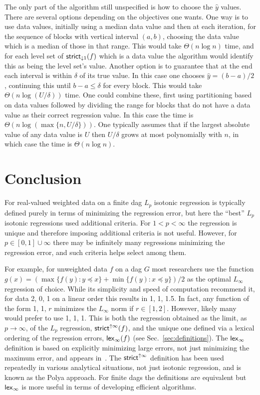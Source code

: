 \documentclass[11pt]{article}
\newcommand{\Strictdown}[2]{\ensuremath{\mathsf{strict}_{\downarrow{#1}}\ifthenelse{\equal{#2}{}}{}{(#2)}}}
\newcommand{\Strictup}[2]{\ensuremath{\mathsf{strict}^{\uparrow {#1}}\ifthenelse{\equal{#2}{}}{}{(#2)}}}
\newcommand{\lex}[2]{\ensuremath{\mathsf{lex}_{#1} \ifthenelse{\equal{#2}{}}{}{(#2)}}}
\begin{document}
The only part of the algorithm still unspecified is how to choose the $\hat{y}$ values.
There are several options depending on the objectives one wants.
One way is to use data values, initially using a median data value and then at each iteration, for the sequence of blocks with vertical interval $(a,b)$, choosing the data value which is a median of those in that range.
This would take $\Theta(n \log n)$ time, and for each level set of \Strictdown{1}{f} which is a data value the algorithm would identify this as being the level set's value.
Another option is to guarantee that at the end each interval is within $\delta$ of its true value.
In this case one chooses $\hat{y} = (b-a)/2$, continuing this until $b-a \leq \delta$ for every block.
This would take $\Theta(n \log (U/\delta))$ time.
One could combine these, first using partitioning based on data values followed by dividing the range for blocks that do not have a data value as their correct regression value.
In this case the time is $\Theta(n \log (\max \{n, U/\delta\}))$.
One typically assumes that if the largest absolute value of any data value is $U$ then $U/\delta$ grows at most polynomially with $n$, in which case the time is $\Theta(n \log n)$.



\section{Conclusion} \label{sec:Conclude}


For real-valued weighted data on a finite dag $L_p$ isotonic regression is typically defined purely in terms of minimizing the regression error, but here the ``best'' $L_p$ isotonic regressions used additional criteria.
For $1 < p < \infty$ the regression is unique and therefore imposing additional criteria is not useful.
However, for $p \in [0,1] \cup {\infty}$ there may be infinitely many regressions minimizing the regression error, and such criteria helps select among them.

For example, for unweighted data $f$ on a dag $G$ most researchers use the function $g(x) = (\max\{f(y): y \preceq x\} + \min\{f(y): x \preceq y\})/2$ as the optimal $L_\infty$ regression of choice.
While its simplicity and speed of computation recommend it, for data 2, 0, 1 on a linear order this results in 1, 1, 1.5.
In fact, any function of the form 1, 1, $r$ minimizes the $L_\infty$ norm if $r \in [1,2]$.
However, likely many would prefer to use 1, 1, 1.
This is both the regression obtained as the limit, as $p \rightarrow \infty$, of the $L_p$ regression, \Strictup{\infty}{f}, and the unique one defined via a lexical ordering of the regression errors, \lex{\infty}{f} (see Sec.~\ref{sec:definitions}).
The \lex{\infty}{} definition is based on explicitly minimizing large errors, not just minimizing the maximum error, and appears in~\cite{Yale_AllLp,QStrictLinfty}.
The \Strictup{\infty}{} definition has been used repeatedly in various analytical situations, not just isotonic regression, and is known as the Polya approach.
For finite dags the definitions are equivalent but \lex{\infty}{} is more useful in terms of developing efficient algorithms.
\end{document}
